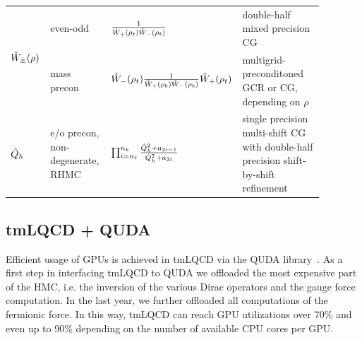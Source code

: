 \documentclass[a0,portrait]{a0poster}
\begin{document}
\begin{multicols}{2}
    \begin{tabular}{p{0.08\linewidth}p{0.2\linewidth}p{0.3\linewidth}p{0.3\linewidth}}
    \multirow{2}{*}{$\hat{W}_\pm(\rho)$} & even-odd & \centering $\frac{1}{\hat{W}_{+}(\rho_t) \hat{W}_{-}(\rho_t)}$ & double-half mixed precision CG \\
      & mass precon & \centering $\hat{W}_{-}(\rho_t) \frac{1}{\hat{W}_{+}(\rho_b) \hat{W}_{-}(\rho_b)} \hat{W}_{+}(\rho_t)$ & multigrid-preconditoned GCR or CG, depending on $\rho$ \\
      $\hat{Q}_h$ & e/o precon, non-degenerate, RHMC & \centering $\prod_{i=n_\ell}^{n_k} \frac{ \hat{Q}^2_h + a_{2i-1} }{ \hat{Q}^2_h + a_{2i} }$ & single precision multi-shift CG with double-half precision shift-by-shift refinement
    \end{tabular}

    \subsection*{tmLQCD + QUDA}

    Efficient usage of GPUs is achieved in tmLQCD via the QUDA library~\cite{Clark:2009wm,Babich:2011np}. As a first step in interfacing tmLQCD to QUDA \cite{Kostrzewa:2022hsv}
    we offloaded the most expensive part of the HMC, i.e. the inversion of the various Dirac operators and the gauge force computation. In the last year, we further offloaded all computations of the fermionic force. In this way, tmLQCD can reach GPU utilizations over 70\% and even up to 90\% depending on the number of available CPU cores per GPU.


\end{multicols}
\end{document}
